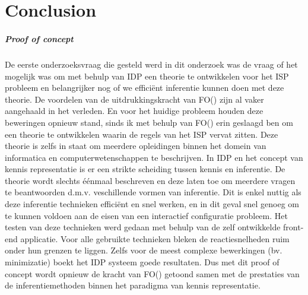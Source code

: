 \chapter{Conclusion}
\label{cha:conclusion}
\paragraph{Proof of concept}
De eerste onderzoeksvraag die gesteld werd in dit onderzoek was de vraag of het mogelijk was om met behulp van IDP een theorie te ontwikkelen voor het ISP probleem en belangrijker nog of we effici\"{e}nt inferentie kunnen doen met deze theorie. De voordelen van de uitdrukkingskracht van FO(\textperiodcentered) zijn al vaker aangehaald \cite{van2016kb} \cite{de2014predicate} in het verleden. En voor het huidige probleem houden deze beweringen opnieuw stand, sinds ik met behulp van FO(\textperiodcentered) erin geslaagd ben om een theorie te ontwikkelen waarin de regels van het ISP vervat zitten. Deze theorie is zelfs in staat om meerdere opleidingen binnen het domein van informatica en computerwetenschappen te beschrijven. 
In IDP en het concept van kennis representatie is er een strikte scheiding tussen kennis en inferentie. De theorie wordt slechts \'{e}\'{e}nmaal beschreven en deze laten toe om meerdere vragen te beantwoorden d.m.v. veschillende vormen van inferentie. Dit is enkel nuttig als deze inferentie technieken effici\"{e}nt en snel werken, en in dit geval snel genoeg om te kunnen voldoen aan de eisen van een interactief configuratie probleem. Het testen van deze technieken werd gedaan met behulp van de zelf ontwikkelde front-end applicatie. Voor alle gebruikte technieken bleken de reactiesnelheden ruim onder hun grenzen te liggen. Zelfs voor de meest complexe bewerkingen (bv. minimizatie) boekt het IDP systeem goede resultaten. Dus met dit proof of concept wordt opnieuw de kracht van FO(\textperiodcentered) getoond samen met de prestaties van de inferentiemethoden binnen het paradigma van kennis representatie.

